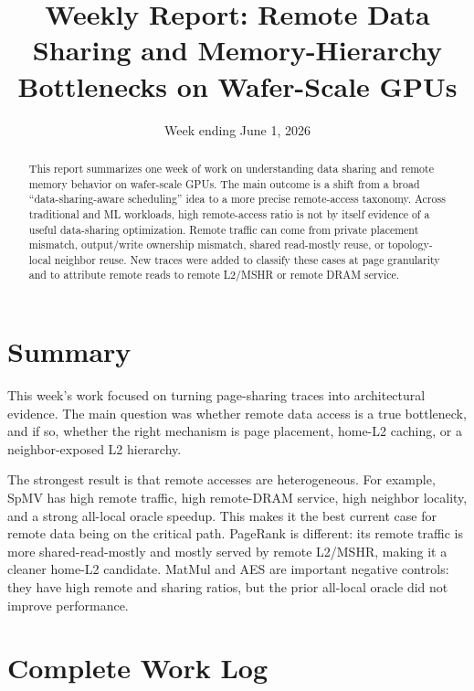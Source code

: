 \documentclass[sigconf,screen,review,anonymous]{acmart}
\title{Weekly Report: Remote Data Sharing and Memory-Hierarchy Bottlenecks on Wafer-Scale GPUs}
\subtitle{Week ending June 1, 2026}
\begin{document}
\begin{abstract}
This report summarizes one week of work on understanding data sharing and remote
memory behavior on wafer-scale GPUs.  The main outcome is a shift from a broad
``data-sharing-aware scheduling'' idea to a more precise remote-access taxonomy.
Across traditional and ML workloads, high remote-access ratio is not by itself
evidence of a useful data-sharing optimization.  Remote traffic can come from
private placement mismatch, output/write ownership mismatch, shared read-mostly
reuse, or topology-local neighbor reuse.  New traces were added to classify
these cases at page granularity and to attribute remote reads to remote L2/MSHR
or remote DRAM service.
\end{abstract}


\maketitle

\section{Summary}

This week's work focused on turning page-sharing traces into architectural
evidence.  The main question was whether remote data access is a true
bottleneck, and if so, whether the right mechanism is page placement,
home-L2 caching, or a neighbor-exposed L2 hierarchy.

The strongest result is that remote accesses are heterogeneous.  For example,
SpMV has high remote traffic, high remote-DRAM service, high neighbor locality,
and a strong all-local oracle speedup.  This makes it the best current case for
remote data being on the critical path.  PageRank is different: its remote
traffic is more shared-read-mostly and mostly served by remote L2/MSHR, making
it a cleaner home-L2 candidate.  MatMul and AES are important negative controls:
they have high remote and sharing ratios, but the prior all-local oracle did
not improve performance.

\section{Complete Work Log}
\end{document}
